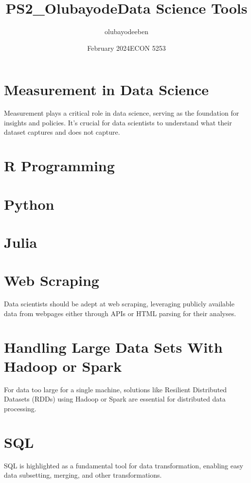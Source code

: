 \documentclass{article}
\title{PS2_Olubayode}
\author{olubayodeeben }
\date{February 2024}
\begin{document}
\title{Data Science Tools}

\date{ECON 5253}
\maketitle

\section*{Measurement in Data Science}
Measurement plays a critical role in data science, serving as the foundation for insights and policies. It's crucial for data scientists to understand what their dataset captures and does not capture.

\section*{R Programming}


\section*{Python}


\section*{Julia}


\section*{Web Scraping}
Data scientists should be adept at web scraping, leveraging publicly available data from webpages either through APIs or HTML parsing for their analyses.

\section*{Handling Large Data Sets With  Hadoop or Spark}
For data too large for a single machine, solutions like Resilient Distributed Datasets (RDDs) using Hadoop or Spark are essential for distributed data processing.

\section*{SQL}
SQL is highlighted as a fundamental tool for data transformation, enabling easy data subsetting, merging, and other transformations.
\end{document}
